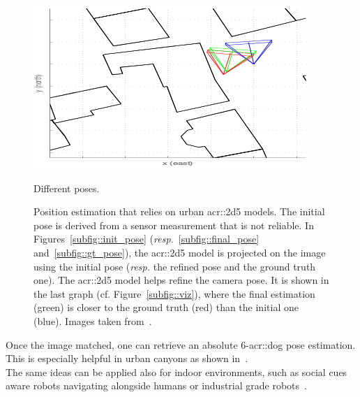 \begin{figure}[htb]
{\begin{subfloatrow}
{                            \includegraphics[width=.4\textwidth]{images/introduction/3d_model_applications/pose_estimation/pose_viz}
                        }{
                            \caption{\label{subfig::viz} Different poses.}
                        }
                    \end{subfloatrow}
                }
                {
                    \caption[
                        Position estimation that relies on urban \gls{acr::2d5} models.
                    ]{
                        \label{fig::navigation}
                        Position estimation that relies on urban \gls{acr::2d5} models.
                        The initial pose is derived from a sensor measurement that is not reliable.
                        In Figures~\ref{subfig::init_pose} (\textit{resp.}~\ref{subfig::final_pose} and~\ref{subfig::gt_pose}), the \gls{acr::2d5} model is projected on the image using the initial pose (\textit{resp.} the refined pose and the ground truth one).
                        The \gls{acr::2d5} model helps refine the camera pose.
                        It is shown in the last graph (cf. Figure~\ref{subfig::viz}), where the final estimation (green) is closer to the ground truth (red) than the initial one (blue).
                        Images taken from~\parencite{armagan2017semantic}.
                    }
                }
            \end{figure}

            Once the image matched, one can retrieve an absolute 6-\gls{acr::dog} pose estimation.
            This is especially helpful in urban canyons as shown in~\parencite{piasco2018survey}.\\
            The same ideas can be applied also for indoor environments, such as social cues aware robots navigating alongside humans or industrial grade robots~\parencite{gupta2018social}.
       
